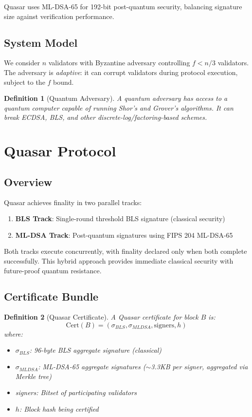 \documentclass[11pt,a4paper]{article}
\newtheorem{definition}{Definition}
\begin{document}
Quasar uses ML-DSA-65 for 192-bit post-quantum security, balancing signature size against verification performance.

\subsection{System Model}

We consider $n$ validators with Byzantine adversary controlling $f < n/3$ validators. The adversary is \emph{adaptive}: it can corrupt validators during protocol execution, subject to the $f$ bound.

\begin{definition}[Quantum Adversary]
A quantum adversary has access to a quantum computer capable of running Shor's and Grover's algorithms. It can break ECDSA, BLS, and other discrete-log/factoring-based schemes.
\end{definition}

\section{Quasar Protocol}

\subsection{Overview}

Quasar achieves finality in two parallel tracks:

\begin{enumerate}
    \item \textbf{BLS Track}: Single-round threshold BLS signature (classical security)
    \item \textbf{ML-DSA Track}: Post-quantum signatures using FIPS 204 ML-DSA-65
\end{enumerate}

Both tracks execute concurrently, with finality declared only when both complete successfully. This hybrid approach provides immediate classical security with future-proof quantum resistance.

\subsection{Certificate Bundle}

\begin{definition}[Quasar Certificate]
A Quasar certificate for block $B$ is:
\begin{equation}
\text{Cert}(B) = (\sigma_{BLS}, \sigma_{MLDSA}, \text{signers}, h)
\end{equation}
where:
\begin{itemize}
    \item $\sigma_{BLS}$: 96-byte BLS aggregate signature (classical)
    \item $\sigma_{MLDSA}$: ML-DSA-65 aggregate signatures ($\sim$3.3KB per signer, aggregated via Merkle tree)
    \item signers: Bitset of participating validators
    \item $h$: Block hash being certified
\end{itemize}
\end{definition}
\end{document}
